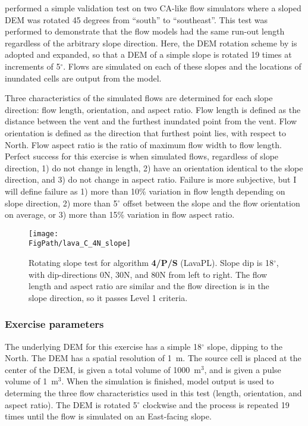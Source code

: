 		\citet{miyamoto1997simulating} performed a simple validation test on two CA-like flow simulators \citep{ishihara1990numerical,miyamoto1997simulating} where a sloped DEM was rotated 45 degrees from ``south'' to ``southeast''. This test was performed to demonstrate that the flow models had the same run-out length regardless of the arbitrary slope direction. Here, the DEM rotation scheme by \citet{miyamoto1997simulating} is adopted and expanded, so that a DEM of a simple slope is rotated 19 times at increments of 5$^{\circ}$. Flows are simulated on each of these slopes and the locations of inundated cells are output from the model.
		
		Three characteristics of the simulated flows are determined for each slope direction: flow length, orientation, and aspect ratio. Flow length is defined as the distance between the vent and the furthest inundated point from the vent. Flow orientation is defined as the direction that furthest point lies, with respect to North. Flow aspect ratio is the ratio of maximum flow width to flow length. Perfect success for this exercise is when simulated flows, regardless of slope direction, 1) do not change in length, 2) have an orientation identical to the slope direction, and 3) do not change in aspect ratio. Failure is more subjective, but I will define failure as 1) more than 10\% variation in flow length depending on slope direction, 2) more than 5$^{\circ}$ offset between the slope and the flow orientation on average, or 3) more than 15\% variation in flow aspect ratio.
		
		\begin{figure}[h!]
			\centering
			\texttt{[image: \\FigPath/lava\_C\_4N\_slope]}
			\caption[Rotating slope test for algorithm \textbf{4/P/S} (LavaPL)]{Rotating slope test for algorithm \textbf{4/P/S} (LavaPL). Slope dip is 18$^{\circ}$, with dip-directions 0N, 30N, and 80N from left to right. The flow length and aspect ratio are similar and the flow direction is in the slope direction, so it passes Level 1 criteria.}
			\label{fig:slope}
		\end{figure}
		
		\subsubsection{Exercise parameters} The underlying DEM for this exercise has a simple 18$^{\circ}$ slope, dipping to the North. The DEM has a spatial resolution of 1~m. The source cell is placed at the center of the DEM, is given a total volume of 1000~m$^3$, and is given a pulse volume of 1~m$^3$. When the simulation is finished, model output is used to determing the three flow characteristics used in this test (length, orientation, and aspect ratio). The DEM is rotated 5$^{\circ}$ clockwise and the process is repeated 19 times until the flow is simulated on an East-facing slope.
		
